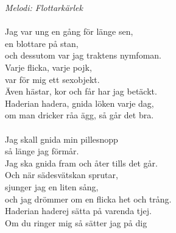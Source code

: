 {\footnotesize\textit{Melodi: Flottarkärlek}}\\
\\
Jag var ung en gång för länge sen,\\
en blottare på stan,\\
och dessutom var jag traktens nymfoman.\\
Varje flicka, varje pojk,\\
var för mig ett sexobjekt.\\
Även hästar, kor och får har jag betäckt.\\
Haderian hadera, gnida löken varje dag,\\
om man dricker råa ägg, så går det bra.\\
\\
Jag skall gnida min pillesnopp\\
så länge jag förmår.\\
Jag ska gnida fram och åter tills det går.\\
Och när sädesvätskan sprutar,\\
sjunger jag en liten sång,\\
och jag drömmer om en flicka het och trång.\\
Haderian haderej sätta på varenda tjej.\\
Om du ringer mig så sätter jag på dig
